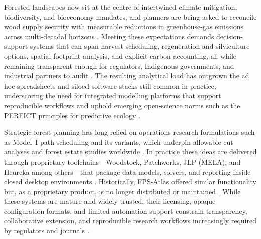 \documentclass[review]{elsarticle}
\begin{document}
Forested landscapes now sit at the centre of intertwined climate mitigation, biodiversity, and bioeconomy mandates, and planners are being asked to reconcile wood supply security with measurable reductions in greenhouse-gas emissions across multi-decadal horizons \citep{canadell2022wgiii, griscom2017natural, fao2020fra}. Meeting these expectations demands decision-support systems that can span harvest scheduling, regeneration and silviculture options, spatial footprint analysis, and explicit carbon accounting, all while remaining transparent enough for regulators, Indigenous governments, and industrial partners to audit \citep{law2018land, smyth2020climate}. The resulting analytical load has outgrown the ad hoc spreadsheets and siloed software stacks still common in practice, underscoring the need for integrated modelling platforms that support reproducible workflows and uphold emerging open-science norms such as the PERFICT principles for predictive ecology \citep{hampton2015tao, lowndes2017path, mcintire2022perfict}.

Strategic forest planning has long relied on operations-research formulations such as Model~I path scheduling and its variants, which underpin allowable-cut analyses and forest estate studies worldwide \citep{johnson1977techniques, gunn2007models, gunn2009some, paradis2013risk}. In practice these ideas are delivered through proprietary toolchains---Woodstock, Patchworks, JLP (MELA), and Heureka among others---that package data models, solvers, and reporting inside closed desktop environments \citep{remsoft-woodstock, patchworks, jlp_mela, heureka}. Historically, FPS-Atlas offered similar functionality but, as a proprietary product, is no longer distributed or maintained \citep{fps_atlas}. While these systems are mature and widely trusted, their licensing, opaque configuration formats, and limited automation support constrain transparency, collaborative extension, and reproducible research workflows increasingly required by regulators and journals \citep{hampton2015tao}.
\end{document}

